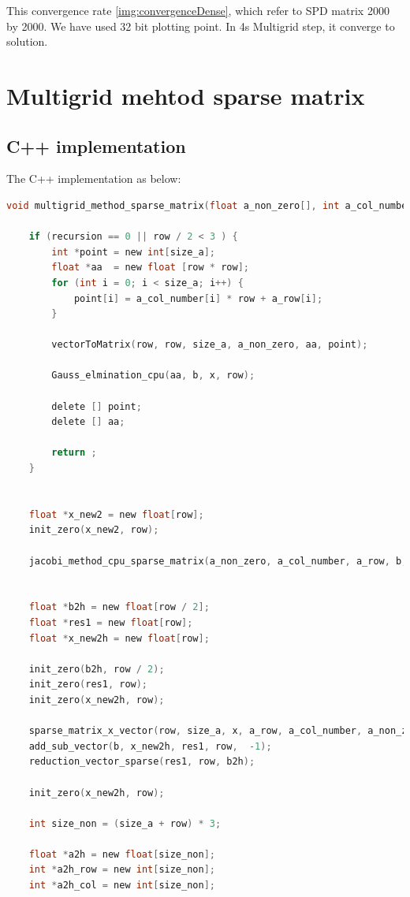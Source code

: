 This convergence rate \ref{img:convergenceDense}, which refer to SPD matrix 2000 by 2000. We have used 32 bit plotting point. In 4s Multigrid step, it converge to solution. 
\section{Multigrid mehtod sparse matrix}
 

\subsection{C++ implementation}

The C++ implementation as below:\\
\begin{lstlisting}[language=C, caption=multigrid method in C++]
	void multigrid_method_sparse_matrix(float a_non_zero[], int a_col_number[], int a_row[], float x[], float b[], int recursion, int row, int alpha, int size_a) {

    if (recursion == 0 || row / 2 < 3 ) {
        int *point = new int[size_a];
        float *aa  = new float [row * row];
        for (int i = 0; i < size_a; i++) {
            point[i] = a_col_number[i] * row + a_row[i];
        }

        vectorToMatrix(row, row, size_a, a_non_zero, aa, point);

        Gauss_elmination_cpu(aa, b, x, row);

        delete [] point;
        delete [] aa;

        return ;
    }


    float *x_new2 = new float[row];
    init_zero(x_new2, row);

    jacobi_method_cpu_sparse_matrix(a_non_zero, a_col_number, a_row, b, x, x_new2, row, alpha, size_a);


    float *b2h = new float[row / 2];
    float *res1 = new float[row];
    float *x_new2h = new float[row];

    init_zero(b2h, row / 2);
    init_zero(res1, row);
    init_zero(x_new2h, row);

    sparse_matrix_x_vector(row, size_a, x, a_row, a_col_number, a_non_zero, x_new2h);
    add_sub_vector(b, x_new2h, res1, row,  -1);
    reduction_vector_sparse(res1, row, b2h);

    init_zero(x_new2h, row);

    int size_non = (size_a + row) * 3;

    float *a2h = new float[size_non];
    int *a2h_row = new int[size_non];
    int *a2h_col = new int[size_non];


\end{lstlisting}

